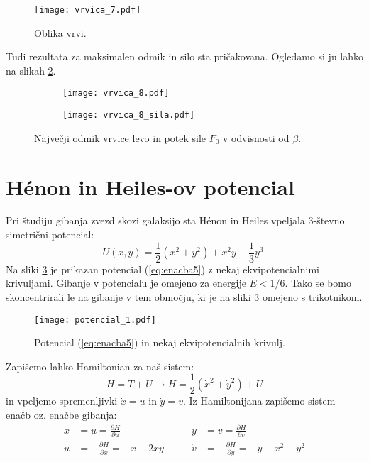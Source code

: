 \documentclass[12pt,a4paper]{article}
\begin{document}
\begin{figure}[H]
    \centering
        \texttt{[image: vrvica\_7.pdf]}
    \caption{Oblika vrvi.} \label{fig:slika5}
\end{figure}

\noindent Tudi rezultata za maksimalen odmik in silo sta pričakovana. Ogledamo si ju lahko na slikah \ref{fig:slika6}.

\begin{figure}[H]
    \centering
    \begin{subfigure}[b]{0.45\textwidth}  			
        \texttt{[image: vrvica\_8.pdf]}
    \end{subfigure}
    \begin{subfigure}[b]{0.45\textwidth}  			
        \texttt{[image: vrvica\_8\_sila.pdf]}
    \end{subfigure}
    \caption{Največji odmik vrvice levo in potek sile $F_0$ v odvisnosti od $\beta$.} 
    \label{fig:slika6}
\end{figure}

\section*{H\'enon in Heiles-ov potencial}
Pri študiju gibanja zvezd skozi galaksijo sta H\'enon in Heiles vpeljala 3-števno simetrični potencial:
\begin{equation} \label{eq:enacba5}
U(x,y)=\frac{1}{2}(x^{2} +y^{2}) + x^{2}y -\frac{1}{3}y^{3}.
\end{equation}
Na sliki \ref{fig:slika7} je prikazan potencial (\ref{eq:enacba5}) z nekaj ekvipotencialnimi krivuljami. Gibanje v potencialu je omejeno za energije $E < 1/6$. Tako se bomo skoncentrirali le na gibanje v tem območju, ki je na sliki \ref{fig:slika7} omejeno s trikotnikom.
\begin{figure}[H]
    \centering
        \texttt{[image: potencial\_1.pdf]}
    \caption{Potencial (\ref{eq:enacba5}) in nekaj ekvipotencialnih krivulj.} \label{fig:slika7}
\end{figure}
\noindent Zapišemo lahko Hamiltonian za naš sistem:
\begin{equation} \label{eq:enacba6}
H=T+U \rightarrow H= \frac{1}{2}(\dot{x}^{2} +\dot{y}^{2}) +U
\end{equation}
in vpeljemo spremenljivki $\dot{x}=u$ in $\dot{y}=v$. Iz Hamiltonijana zapišemo sistem enačb oz. enačbe gibanja:
\begin{align} \label{eq:enacba7}
\dot{x}&=u=\frac{\partial H}{\partial u} &\qquad \dot{y} &= v=\frac{\partial H}{\partial v} \nonumber \\
\dot{u}&= -\frac{\partial H}{\partial x}= -x -2xy & \qquad \dot{v}&=-\frac{\partial H}{\partial y}= -y -x^{2} +y^{2}
\end{align}
\end{document}
